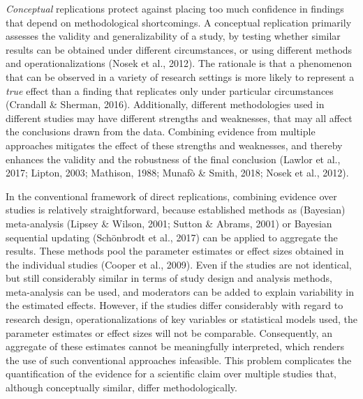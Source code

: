 \documentclass[
]{interact}
\begin{document}
\emph{Conceptual} replications protect against placing too much
confidence in findings that depend on methodological shortcomings. A
conceptual replication primarily assesses the validity and
generalizability of a study, by testing whether similar results can be
obtained under different circumstances, or using different methods and
operationalizations (Nosek et al., 2012). The rationale is that a
phenomenon that can be observed in a variety of research settings is
more likely to represent a \emph{true} effect than a finding that
replicates only under particular circumstances (Crandall \& Sherman,
2016). Additionally, different methodologies used in different studies
may have different strengths and weaknesses, that may all affect the
conclusions drawn from the data. Combining evidence from multiple
approaches mitigates the effect of these strengths and weaknesses, and
thereby enhances the validity and the robustness of the final conclusion
(Lawlor et al., 2017; Lipton, 2003; Mathison, 1988; Munafò \& Smith,
2018; Nosek et al., 2012).

In the conventional framework of direct replications, combining evidence
over studies is relatively straightforward, because established methods
as (Bayesian) meta-analysis (Lipsey \& Wilson, 2001; Sutton \& Abrams,
2001) or Bayesian sequential updating (Schönbrodt et al., 2017) can be
applied to aggregate the results. These methods pool the parameter
estimates or effect sizes obtained in the individual studies (Cooper et
al., 2009). Even if the studies are not identical, but still
considerably similar in terms of study design and analysis methods,
meta-analysis can be used, and moderators can be added to explain
variability in the estimated effects. However, if the studies differ
considerably with regard to research design, operationalizations of key
variables or statistical models used, the parameter estimates or effect
sizes will not be comparable. Consequently, an aggregate of these
estimates cannot be meaningfully interpreted, which renders the use of
such conventional approaches infeasible. This problem complicates the
quantification of the evidence for a scientific claim over multiple
studies that, although conceptually similar, differ methodologically.
\end{document}
